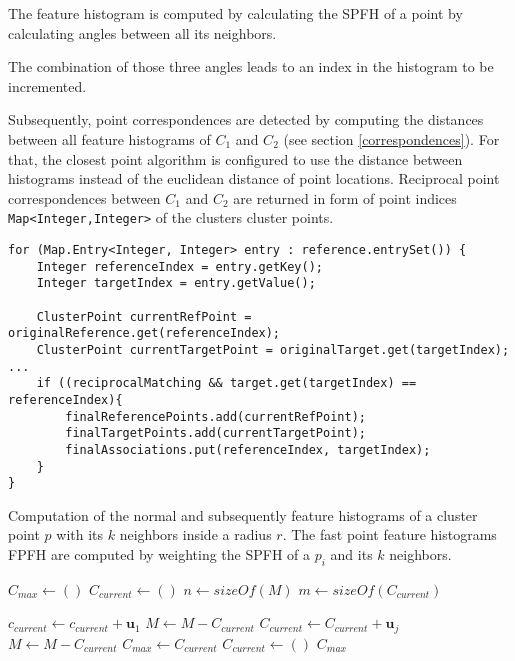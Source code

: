 
The feature histogram is computed by calculating the SPFH of a point by calculating angles between all its neighbors.




The combination of those three angles leads to an index in the histogram to be incremented. 





Subsequently, point correspondences are detected by computing the distances between all feature histograms of $C_1$ and $C_2$ (see section \ref{correspondences}). For that, the closest point algorithm is configured to use the distance between histograms instead of the euclidean distance of point locations. Reciprocal point correspondences between $C_1$ and $C_2$ are returned in form of point indices \texttt{Map<Integer,Integer>}  of the clusters cluster points.
\begin{lstlisting}
for (Map.Entry<Integer, Integer> entry : reference.entrySet()) {
	Integer referenceIndex = entry.getKey();
	Integer targetIndex = entry.getValue();

	ClusterPoint currentRefPoint = originalReference.get(referenceIndex);
	ClusterPoint currentTargetPoint = originalTarget.get(targetIndex);
...
	if ((reciprocalMatching && target.get(targetIndex) == referenceIndex){
		finalReferencePoints.add(currentRefPoint);
		finalTargetPoints.add(currentTargetPoint);
		finalAssociations.put(referenceIndex, targetIndex);
	}
}
\end{lstlisting}
\begin{algorithm}[tbp]
	\caption{Computation of the normal and subsequently feature histograms of a cluster point $p$ with its $k$ neighbors inside a radius $r$. The fast point feature histograms FPFH are computed by weighting the SPFH of a $p_i$ and its $k$ neighbors.}
	
	\begin{algorithmic}[1]     %
		\label{featureHistograms}
		
		\State $\mathit{C_{max}} \gets ()$
		\State $\mathit{C_{current}} \gets ()$
		\State $n \gets \mathit{sizeOf}(M)$
		\State $m \gets \mathit{sizeOf}(C_{current})$
		
		\State $\mathit{c_{current}} \gets \mathit{c_{current}} + \boldsymbol{u}_1$
		\State $M \gets M - C_{current}$
		\State $C_{current} \gets C_{current} + \boldsymbol{u}_j$
		\EndIf
		\EndFor
		\EndFor
		\State $M \gets M - C_{current}$
		\State $C_{max} \gets C_{current}$
		\EndIf
		\State $C_{current} \gets ()$
		\EndWhile
		\State\Return $C_{max}$
		\EndProcedure	
	\end{algorithmic}
\end{algorithm}

